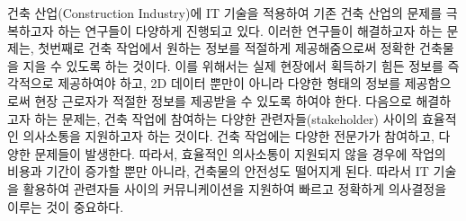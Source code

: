 
건축 산업(Construction Industry)에 IT 기술을 적용하여 기존 건축 산업의 문제를 극복하고자 하는 연구들이 다양하게 진행되고 있다. 이러한 연구들이 해결하고자 하는 문제는, 첫번째로 건축 작업에서 원하는 정보를 적절하게 제공해줌으로써 정확한 건축물을 지을 수 있도록 하는 것이다. 이를 위해서는 실제 현장에서 획득하기 힘든 정보를 즉각적으로 제공하여야 하고\cite{yeh_-site_2012,cote_augmented_2013,chi_research_2013}, 2D 데이터 뿐만이 아니라 다양한 형태의 정보를 제공함으로써 현장 근로자가 적절한 정보를 제공받을 수 있도록 하여야 한다\cite{behzadan_ubiquitous_2008,schall_handheld_2009}. 다음으로 해결하고자 하는 문제는, 건축 작업에 참여하는 다양한 관련자들(stakeholder) 사이의 효율적인 의사소통을 지원하고자 하는 것이다. 건축 작업에는 다양한 전문가가 참여하고, 다양한 문제들이 발생한다. 따라서, 효율적인 의사소통이 지원되지 않을 경우에 작업의 비용과 기간이 증가할 뿐만 아니라\cite{schall_handheld_2009}, 건축물의 안전성도 떨어지게 된다\cite{wagner_building_2012,lin_using_2014}. 따라서 IT 기술을 활용하여 관련자들 사이의 커뮤니케이션을 지원하여 빠르고 정확하게 의사결정을 이루는 것이 중요하다. %


